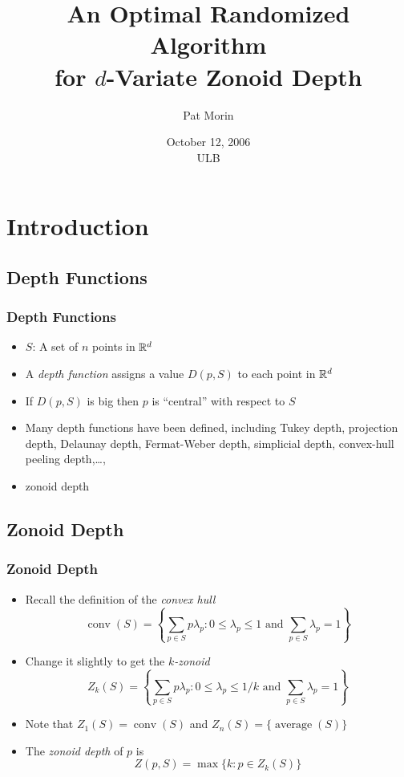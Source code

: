 \documentclass{beamer}
\title{An Optimal Randomized Algorithm \\ 
	for $d$-Variate Zonoid Depth}
\author{Pat Morin}
\institute{Carleton University}
\date{October 12, 2006 \\ ULB}
\DeclareMathOperator{\conv}{conv}
\DeclareMathOperator{\average}{average}
\begin{document}
\frame{\titlepage}

\section[Outline]{}
\frame{\tableofcontents}

\section{Introduction}
\subsection{Depth Functions}
\frame
{
  \frametitle{Depth Functions}
  \begin{itemize}
  \item<1-> $S$: A set of $n$ points in $\mathbb{R}^d$
  \item<2-> A \emph{depth function} assigns a value $D(p,S)$ to each point in $\mathbb{R}^d$
  \item<3-> If $D(p,S)$ is big then $p$ is ``central'' with respect to $S$
  \item<4-> Many depth functions have been defined, including Tukey depth,
projection depth, Delaunay depth, Fermat-Weber depth, simplicial
depth, convex-hull peeling depth,\ldots,
  \item<5->zonoid depth
  \end{itemize}
}
    
\subsection{Zonoid Depth}
\frame
{
   \frametitle{Zonoid Depth}
   \begin{itemize}
   \item<1-> Recall the definition of the \emph{convex hull}
    \[ \conv(S) = \left\{\sum_{p\in S} p\lambda_p : 
         \mbox{$0\le\lambda_p\le 1$ and $\sum_{p\in S}\lambda_p = 1$} 
        \right\} 
    \]
   \item<2-> Change it slightly to get the \emph{$k$-zonoid}
    \[ Z_k(S) = \left\{\sum_{p\in S} p\lambda_p : 
         \mbox{$0\le\lambda_p\le 1/k$ and $\sum_{p\in S}\lambda_p = 1$} 
        \right\} 
    \]
   \item<3-> Note that $Z_1(S)=\conv(S)$ and $Z_n(S)=\{\average(S)\}$ 
   \item<4-> The \emph{zonoid depth} of $p$ is 
     \[ Z(p,S)=\max\{k : p\in Z_k(S)\} \]
   \end{itemize}
}
\end{document}
